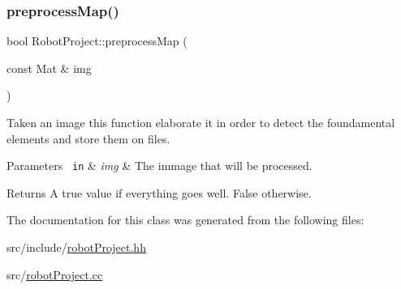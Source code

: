 \subsubsection{\texorpdfstring{preprocessMap()}{preprocessMap()}}
{\footnotesize\ttfamily bool Robot\+Project\+::preprocess\+Map (\begin{DoxyParamCaption}\item[{const Mat \&}]{img }\end{DoxyParamCaption})}



Taken an image this function elaborate it in order to detect the foundamental elements and store them on files. 


\begin{DoxyParams}[1]{Parameters}
\mbox{\texttt{ in}}  & {\em img} & The immage that will be processed. \\
\hline
\end{DoxyParams}
\begin{DoxyReturn}{Returns}
A true value if everything goes well. False otherwise. 
\end{DoxyReturn}


The documentation for this class was generated from the following files\+:\begin{DoxyCompactItemize}
\item 
src/include/\mbox{\hyperlink{robot_project_8hh}{robot\+Project.\+hh}}\item 
src/\mbox{\hyperlink{robot_project_8cc}{robot\+Project.\+cc}}\end{DoxyCompactItemize}
